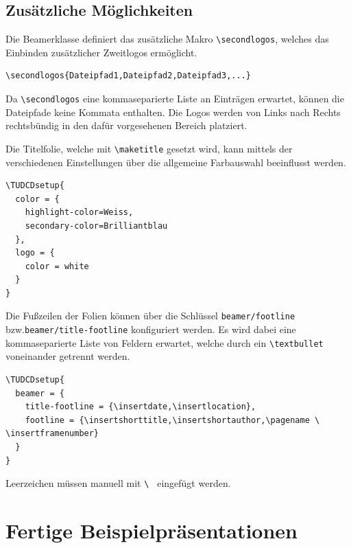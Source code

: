 \documentclass[
  logo={
    color=blue,
    language=de,
    colormodel=rgb
  },
  fontsize=11tudpt,
  usemargin,
  oneside
]{tudcdreprt}
\begin{document}
\subsection{Zusätzliche Möglichkeiten}

Die Beamerklasse definiert das zusätzliche Makro \lstinline|\secondlogos|, welches das Einbinden zusätzlicher
Zweitlogos ermöglicht.
\begin{lstlisting}
\secondlogos{Dateipfad1,Dateipfad2,Dateipfad3,...}
\end{lstlisting}
Da \lstinline|\secondlogos| eine kommaseparierte Liste an Einträgen erwartet, können die Dateipfade keine Kommata enthalten.
Die Logos werden von Links nach Rechts rechtsbündig in den dafür vorgesehenen Bereich platziert.

Die Titelfolie, welche mit \lstinline|\maketitle| gesetzt wird, kann mittels der verschiedenen Einstellungen über
die allgemeine Farbauswahl beeinflusst werden.
\begin{lstlisting}
\TUDCDsetup{
  color = {
    highlight-color=Weiss,
    secondary-color=Brilliantblau
  },
  logo = {
    color = white
  }
}
\end{lstlisting}

Die Fußzeilen der Folien können über die Schlüssel \lstinline|beamer/footline| bzw.\@ \lstinline|beamer/title-footline|
konfiguriert werden. Es wird dabei eine kommaseparierte Liste von Feldern erwartet, welche durch ein \lstinline|\textbullet|
voneinander getrennt werden.
\begin{lstlisting}
\TUDCDsetup{
  beamer = {
    title-footline = {\insertdate,\insertlocation},
    footline = {\insertshorttitle,\insertshortauthor,\pagename \ \insertframenumber}
  }
}
\end{lstlisting}

Leerzeichen müssen manuell mit \lstinline[showspaces=true]|\ | eingefügt werden.

\section{Fertige Beispielpräsentationen}



\end{document}
